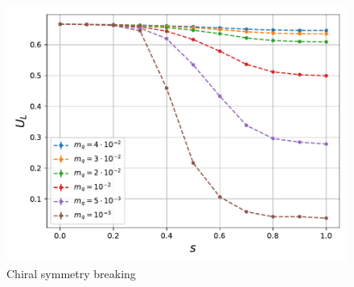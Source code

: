 \begin{figure}[h]
\begin{minipage}{0.45\textwidth}
	\includegraphics[scale=0.48]{figures/chiral_PT/binder.pdf}
\end{minipage}
\hfill
\caption{Chiral symmetry breaking}
\label{fig:chiral:symmetry_breaking}
\end{figure}


